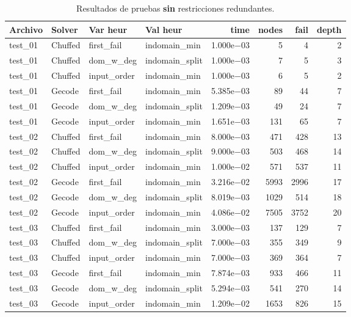 \begin{compactfloats}
\begin{table}[H]
  \centering
  \small
  \setlength{\tabcolsep}{10.8pt}
  \caption{Resultados de pruebas \textbf{sin} restricciones redundantes.}
  \label{tab:pruebas-sudoku-off}
  \begin{tabular}{l l l l r r r r}
    \toprule
    \textbf{Archivo} & \textbf{Solver} & \textbf{Var heur} & \textbf{Val heur} & \textbf{time} & \textbf{nodes} & \textbf{fail} & \textbf{depth} \\
    \midrule
    test\_01 & Chuffed & first\_fail  & indomain\_min   & 1.000e$-$03 & 5    & 4    & 2 \\
    test\_01 & Chuffed & dom\_w\_deg  & indomain\_split & 1.000e$-$03 & 7    & 5    & 3 \\
    test\_01 & Chuffed & input\_order & indomain\_min   & 1.000e$-$03 & 6    & 5    & 2 \\
    test\_01 & Gecode  & first\_fail  & indomain\_min   & 5.385e$-$03 & 89   & 44   & 7 \\
    test\_01 & Gecode  & dom\_w\_deg  & indomain\_split & 1.209e$-$03 & 49   & 24   & 7 \\
    test\_01 & Gecode  & input\_order & indomain\_min   & 1.651e$-$03 & 131  & 65   & 7 \\
    \midrule
    test\_02 & Chuffed & first\_fail  & indomain\_min   & 8.000e$-$03 & 471  & 428  & 13 \\
    test\_02 & Chuffed & dom\_w\_deg  & indomain\_split & 9.000e$-$03 & 503  & 468  & 14 \\
    test\_02 & Chuffed & input\_order & indomain\_min   & 1.000e$-$02 & 571  & 537  & 11 \\
    test\_02 & Gecode  & first\_fail  & indomain\_min   & 3.216e$-$02 & 5993 & 2996 & 17 \\
    test\_02 & Gecode  & dom\_w\_deg  & indomain\_split & 8.019e$-$03 & 1029 & 514  & 18 \\
    test\_02 & Gecode  & input\_order & indomain\_min   & 4.086e$-$02 & 7505 & 3752 & 20 \\
    \midrule
    test\_03 & Chuffed & first\_fail  & indomain\_min   & 3.000e$-$03 & 137  & 129  & 7 \\
    test\_03 & Chuffed & dom\_w\_deg  & indomain\_split & 7.000e$-$03 & 355  & 349  & 9 \\
    test\_03 & Chuffed & input\_order & indomain\_min   & 7.000e$-$03 & 369  & 364  & 7 \\
    test\_03 & Gecode  & first\_fail  & indomain\_min   & 7.874e$-$03 & 933  & 466  & 11 \\
    test\_03 & Gecode  & dom\_w\_deg  & indomain\_split & 5.294e$-$03 & 541  & 270  & 14 \\
    test\_03 & Gecode  & input\_order & indomain\_min   & 1.209e$-$02 & 1653 & 826  & 15 \\
    \bottomrule
  \end{tabular}
\end{table}
\end{compactfloats}

\FloatBarrier
